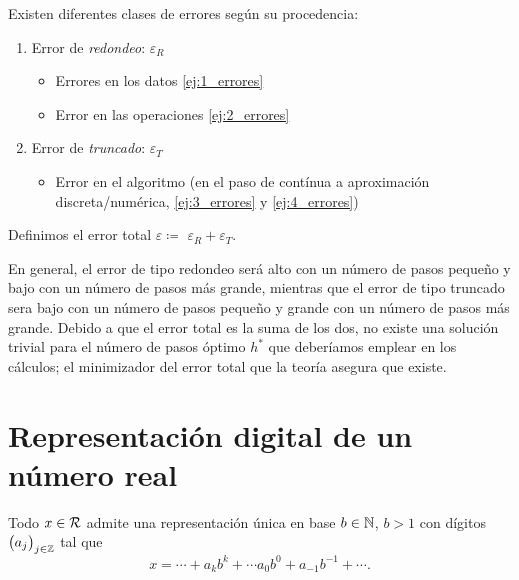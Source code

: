 \begin{defi}[Errores]
    Existen diferentes clases de errores según su procedencia:
    \begin{enumerate}
            \item Error de \emph{redondeo}: $\varepsilon_R$
            \begin{itemize}
                    \item Errores en los datos \ref{ej:1_errores}
                    \item Error en las operaciones \ref{ej:2_errores}
            \end{itemize}
            \item Error de \emph{truncado}: $\varepsilon_T$
            \begin{itemize}
                    \item Error en el algoritmo (en el paso de contínua a aproximación discreta/numérica, \ref{ej:3_errores} y \ref{ej:4_errores})
            \end{itemize}
    \end{enumerate}
\end{defi}

\begin{defi}
    Definimos el error total $\varepsilon \coloneqq$ $\varepsilon_R + \varepsilon_T$.
\end{defi}

\begin{obs}
    En general, el error de tipo redondeo será alto con un número de pasos pequeño y bajo con un número de pasos más grande, mientras que el error de tipo truncado sera bajo con un número de pasos pequeño y grande con un número de pasos más grande. Debido a que el error total es la suma de los dos, no existe una solución trivial para el número de pasos óptimo $h^*$ que deberíamos emplear en los cálculos; el minimizador del error total que la teoría asegura que existe.
\end{obs}

\section{Representación digital de un número real}
    
\begin{prop}
    Todo $x \in \mathcal{R}$ admite una representación única en base $b \in \mathbb{N}$, $b>1$ con dígitos $\left( a_j\right) _{j \in \mathbb{Z}}$ tal que 
    \[
            x = \cdots + a_kb^k + \cdots a_0b^0 + a_{-1}b^{-1} + \cdots \nonumber.
    \]
\end{prop}

